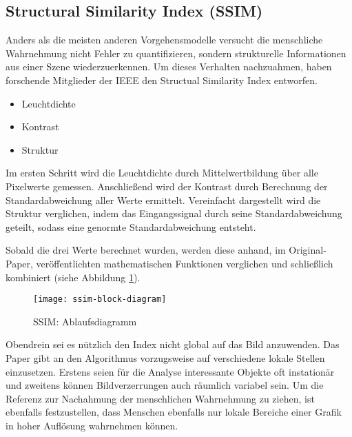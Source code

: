 \subsection{Structural Similarity Index (SSIM)}
Anders als die meisten anderen Vorgehensmodelle versucht die menschliche
Wahrnehmung nicht Fehler zu quantifizieren, sondern strukturelle Informationen
aus einer Szene wiederzuerkennen. Um dieses Verhalten nachzuahmen, haben
forschende Mitglieder der IEEE den Structual Similarity Index entworfen.
\parencite{ssim-orig-paper}

\begin{itemize}[topsep=0pt]
    \item Leuchtdichte
    \item Kontrast
    \item Struktur
\end{itemize}

Im ersten Schritt wird die Leuchtdichte durch Mittelwertbildung über alle
Pixelwerte gemessen. Anschließend wird der Kontrast durch Berechnung der
Standardabweichung aller Werte ermittelt. Vereinfacht dargestellt wird die
Struktur verglichen, indem das Eingangssignal durch seine Standardabweichung
geteilt, sodass eine genormte Standardabweichung entsteht.
\parencite{ssim-summary}

Sobald die drei Werte berechnet wurden, werden diese anhand, im Original-Paper,
veröffentlichten mathematischen Funktionen verglichen und schließlich
kombiniert (siehe Abbildung \ref{fig:ssim-block-diagram}).
\parencite{ssim-summary}

\begin{figure}[H]
    \centering
    \texttt{[image: ssim-block-diagram]}
    \caption{SSIM: Ablaufsdiagramm}
    \label{fig:ssim-block-diagram}
\end{figure}

Obendrein sei es nützlich den Index nicht global auf das Bild anzuwenden. Das
Paper gibt an den Algorithmus vorzugsweise auf verschiedene lokale Stellen
einzusetzen. Erstens seien für die Analyse interessante Objekte oft instationär
und zweitens können Bildverzerrungen auch räumlich variabel sein. Um die
Referenz zur Nachahmung der menschlichen Wahrnehmung zu ziehen, ist ebenfalls
festzustellen, dass Menschen ebenfalls nur lokale Bereiche einer Grafik in hoher
Auflösung wahrnehmen können. \parencite{ssim-summary}

